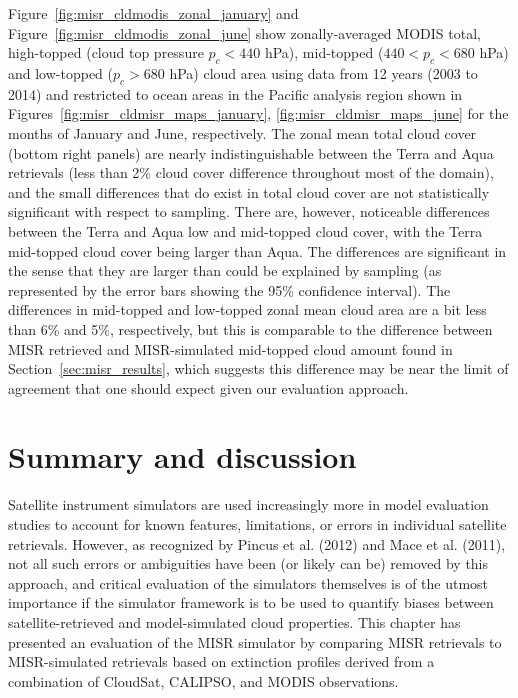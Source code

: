 Figure~\ref{fig:misr_cldmodis_zonal_january} and
Figure~\ref{fig:misr_cldmodis_zonal_june} show zonally-averaged MODIS
total, high-topped (cloud top pressure \(p_c < 440\) hPa), mid-topped
(\(440 < p_c < 680\) hPa) and low-topped (\(p_c > 680\) hPa) cloud area
using data from 12 years (2003 to 2014) and restricted to ocean areas in
the Pacific analysis region shown in
Figures~\ref{fig:misr_cldmisr_maps_january}, \ref{fig:misr_cldmisr_maps_june}
for the months of January and June, respectively. The zonal mean total
cloud cover (bottom right panels) are nearly indistinguishable between
the Terra and Aqua retrievals (less than 2\% cloud cover difference
throughout most of the domain), and the small differences that do exist
in total cloud cover are not statistically significant with respect to
sampling. There are, however, noticeable differences between the Terra
and Aqua low and mid-topped cloud cover, with the Terra mid-topped cloud
cover being larger than Aqua. The differences are significant in the
sense that they are larger than could be explained by sampling (as
represented by the error bars showing the 95\% confidence interval). The
differences in mid-topped and low-topped zonal mean cloud area are a bit
less than 6\% and 5\%, respectively, but this is comparable to the
difference between MISR retrieved and MISR-simulated mid-topped cloud
amount found in Section~\ref{sec:misr_results}, which suggests this
difference may be near the limit of agreement that one should expect
given our evaluation approach.

\section{Summary and discussion}\label{sec:misrux5fsummary}

Satellite instrument simulators are used increasingly more in model
evaluation studies to account for known features, limitations, or errors
in individual satellite retrievals. However, as recognized by Pincus et
al. (2012) and Mace et al. (2011), not all such errors or ambiguities
have been (or likely can be) removed by this approach, and critical
evaluation of the simulators themselves is of the utmost importance if
the simulator framework is to be used to quantify biases between
satellite-retrieved and model-simulated cloud properties. This chapter
has presented an evaluation of the MISR simulator by comparing MISR
retrievals to MISR-simulated retrievals based on extinction profiles
derived from a combination of CloudSat, CALIPSO, and MODIS observations.

